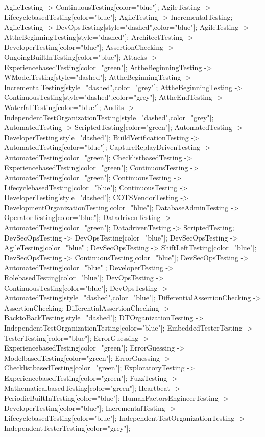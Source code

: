 \documentclass{article}
\begin{document}
{AgileTesting -> ContinuousTesting[color="blue"];
AgileTesting -> LifecyclebasedTesting[color="blue"];
AgileTesting -> IncrementalTesting;
AgileTesting -> DevOpsTesting[style="dashed",color="blue"];
AgileTesting -> AttheBeginningTesting[style="dashed"];
ArchitectTesting -> DeveloperTesting[color="blue"];
AssertionChecking -> OngoingBuiltInTesting[color="blue"];
Attacks -> ExperiencebasedTesting[color="green"];
AttheBeginningTesting -> WModelTesting[style="dashed"];
AttheBeginningTesting -> IncrementalTesting[style="dashed",color="grey"];
AttheBeginningTesting -> ContinuousTesting[style="dashed",color="grey"];
AttheEndTesting -> WaterfallTesting[color="blue"];
Audits -> IndependentTestOrganizationTesting[style="dashed",color="grey"];
AutomatedTesting -> ScriptedTesting[color="green"];
AutomatedTesting -> DeveloperTesting[style="dashed"];
BuildVerificationTesting -> AutomatedTesting[color="blue"];
CaptureReplayDrivenTesting -> AutomatedTesting[color="green"];
ChecklistbasedTesting -> ExperiencebasedTesting[color="green"];
ContinuousTesting -> AutomatedTesting[color="green"];
ContinuousTesting -> LifecyclebasedTesting[color="blue"];
ContinuousTesting -> DeveloperTesting[style="dashed"];
COTSVendorTesting -> DevelopmentOrganizationTesting[color="blue"];
DatabaseAdminTesting -> OperatorTesting[color="blue"];
DatadrivenTesting -> AutomatedTesting[color="green"];
DatadrivenTesting -> ScriptedTesting;
DevSecOpsTesting -> DevOpsTesting[color="blue"];
DevSecOpsTesting -> AgileTesting[color="blue"];
DevSecOpsTesting -> ShiftLeftTesting[color="blue"];
DevSecOpsTesting -> ContinuousTesting[color="blue"];
DevSecOpsTesting -> AutomatedTesting[color="blue"];
DeveloperTesting -> RolebasedTesting[color="blue"];
DevOpsTesting -> ContinuousTesting[color="blue"];
DevOpsTesting -> AutomatedTesting[style="dashed",color="blue"];
DifferentialAssertionChecking -> AssertionChecking;
DifferentialAssertionChecking -> BacktoBackTesting[style="dashed"];
DTOrganizationTesting -> IndependentTestOrganizationTesting[color="blue"];
EmbeddedTesterTesting -> TesterTesting[color="blue"];
ErrorGuessing -> ExperiencebasedTesting[color="green"];
ErrorGuessing -> ModelbasedTesting[color="green"];
ErrorGuessing -> ChecklistbasedTesting[color="green"];
ExploratoryTesting -> ExperiencebasedTesting[color="green"];
FuzzTesting -> MathematicalbasedTesting[color="green"];
Heartbeat -> PeriodicBuiltInTesting[color="blue"];
HumanFactorsEngineerTesting -> DeveloperTesting[color="blue"];
IncrementalTesting -> LifecyclebasedTesting[color="blue"];
IndependentTestOrganizationTesting -> IndependentTesterTesting[color="grey"];
}
\end{document}
